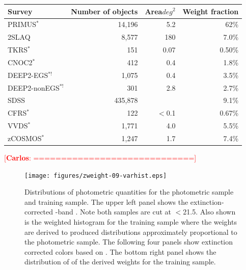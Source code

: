 \documentclass[preprint]{aastex}
\newcommand{\rmax}{21.5}
\newcommand{\cc}[1]{\textcolor{red}{[{\bf Carlos}: #1]}}
\begin{document}
\begin{table}[!ht]
\label{tbl:weistats}
\begin{center}
\begin{tabular}{ l r r r }\hline \hline
Survey & Number of objects & Area$deg^2$ & Weight fraction \\ \hline 
PRIMUS$^*$ &14,196 &5.2 & 62\% \\
2SLAQ  &8,577 & 180 & 7.0\%\\
TKRS$^*$  &151  & 0.07& 0.50\%\\
CNOC2$^*$ &412  &0.4 & 1.8\%\\
DEEP2-EGS$^{*!}$ &1,075  & 0.4 & 3.5\%\\
DEEP2-nonEGS$^{*!}$ &301  & 2.8 & 2.7\%\\
SDSS &435,878  & & 9.1\%\\
CFRS$^*$ &122  & $<$0.1 & 0.67\%\\
VVDS$^*$ &1,771  &4.0  & 5.5\%\\
zCOSMOS$^*$ &1,247 &1.7  & 7.4\% \\ \hline \hline
\end{tabular}
\end{center} 
\end{table}


\cc{=============================} 

\begin{figure}[t] \centering
    \texttt{[image: figures/zweight-09-varhist.eps]}

    \caption{Distributions of photometric quantities for the photometric sample
    and training sample.  The upper left panel shows the extinction-corrected
    \rmag-band \cmodelmag.  Note both samples are cut at \rmag$ < $\rmax.  
    Also shown is the weighted histogram for the training sample where
    the weights are derived to produced distributions approximately 
    proportional to the photometric sample.
    The following four panels show extinction corrected colors based on
    \modelmag.  The bottom right panel shows the distribution of of the
    derived weights for the training sample.}
    \label{fig:varhist}

    \vspace{2em}
\end{figure}
\end{document}
